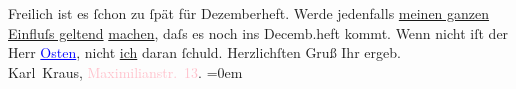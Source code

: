            \pstart
           Freilich ist es ſchon zu ſpät für Dezemberheft. Werde jedenfalls \uline{meinen ganzen Einfluſs geltend}{ }\uline{machen}, daſs es noch ins Decemb.heft kommt. Wenn
                    nicht iſt der Herr \textcolor{blue}{\uline{Osten}}{}\ledrightnote{\textcolor{blue}{Heinrich Osten}}, nicht \uline{ich} daran ſchuld.\pend
           \pstart
           Herzlichſten Gruß Ihr ergeb.{\\[\baselineskip]}\spacefill\mbox{Karl Kraus,}{ }\textcolor{pink}{Maximilianstr. 13}{}\ledrightnote{\textcolor{pink}{Mahlerstraße}}. \pend
           \leftskip=0em{}\endnumbering{}  
      